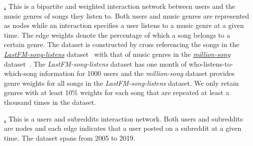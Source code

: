 \underline{\textbf{\fm.}} This is a bipartite and weighted interaction network between users and the music genres of songs they listen to. Both users and music genres are represented as nodes while an interaction specifies a user listens to a music genre at a given time. The edge weights denote the percentage of which a song belongs to a certain genre. 
The dataset is constructed by cross referencing the songs in the \href{http://snap.stanford.edu/jodie/#datasets}{\textit{LastFM-song-listens}} dataset~\cite{kumar2019predicting,hidasi2012fast} with that of music genres in the \href{http://millionsongdataset.com/}{\textit{million-song}} dataset~\cite{bertin2011million}. 
The \textit{LastFM-song-listens} dataset has one month of who-listens-to-which-song information for 1000 users and the \textit{million-song} dataset provides genre weights for all songs in the \textit{LastFM-song-listens} dataset. 
We only retain genres with at least 10\% weights for each song that are repeated at least a thousand times in the dataset. 


\underline{\textbf{\subreddit.}} This is a users and subreddits interaction network. Both users and subreddits are nodes and each edge indicates that a user posted on a subreddit at a given time. The dataset spans from 2005 to 2019. 






